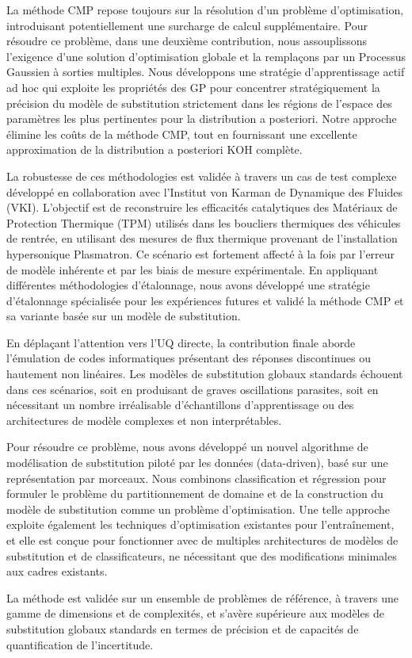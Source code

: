 \smallskip
La m\'ethode CMP repose toujours sur la r\'esolution d'un probl\`eme d'optimisation, introduisant potentiellement une surcharge de calcul suppl\'ementaire. Pour r\'esoudre ce probl\`eme,
dans une deuxi\`eme contribution, nous assouplissons l'exigence d'une solution d'optimisation globale et la rempla\c{c}ons par un Processus Gaussien \`a sorties multiples. Nous d\'eveloppons une strat\'egie d'apprentissage actif ad hoc qui exploite les propri\'et\'es des GP pour concentrer strat\'egiquement la pr\'ecision du mod\`ele de substitution strictement dans les r\'egions de l'espace des param\`etres les plus pertinentes pour la distribution a posteriori. Notre approche \'elimine les co\^uts de la m\'ethode CMP, tout en fournissant une excellente approximation de la distribution a posteriori KOH compl\`ete.

\smallskip
La robustesse de ces m\'ethodologies est valid\'ee \`a travers un cas de test complexe d\'evelopp\'e en collaboration avec l'Institut von Karman de Dynamique des Fluides (VKI). L'objectif est de reconstruire les efficacit\'es catalytiques des Mat\'eriaux de Protection Thermique (TPM) utilis\'es dans les boucliers thermiques des v\'ehicules de rentr\'ee, en utilisant des mesures de flux thermique provenant de l'installation hypersonique Plasmatron. Ce sc\'enario est fortement affect\'e \`a la fois par l'erreur de mod\`ele inh\'erente et par les biais de mesure exp\'erimentale. En appliquant diff\'erentes m\'ethodologies d'\'etalonnage, nous avons d\'evelopp\'e une strat\'egie d'\'etalonnage sp\'ecialis\'ee pour les exp\'eriences futures et valid\'e la m\'ethode CMP et sa variante bas\'ee sur un mod\`ele de substitution.

\smallskip
En d\'epla\c{c}ant l'attention vers l'UQ directe, la contribution finale aborde l'\'emulation de codes informatiques pr\'esentant des r\'eponses discontinues ou hautement non lin\'eaires. Les mod\`eles de substitution globaux standards \'echouent dans ces sc\'enarios, soit en produisant de graves oscillations parasites, soit en n\'ecessitant un nombre irr\'ealisable d'\'echantillons d'apprentissage ou des architectures de mod\`ele complexes et non interpr\'etables.

Pour r\'esoudre ce probl\`eme, nous avons d\'evelopp\'e un nouvel algorithme de mod\'elisation de substitution pilot\'e par les donn\'ees (data-driven), bas\'e sur une repr\'esentation par morceaux. Nous combinons classification et r\'egression pour formuler le probl\`eme du partitionnement de domaine et de la construction du mod\`ele de substitution comme un probl\`eme d'optimisation. Une telle approche exploite \'egalement les techniques d'optimisation existantes pour l'entra\^inement, et elle est con\c{c}ue pour fonctionner avec de multiples architectures de mod\`eles de substitution et de classificateurs, ne n\'ecessitant que des modifications minimales aux cadres existants.

La m\'ethode est valid\'ee sur un ensemble de probl\`emes de r\'ef\'erence, \`a travers une gamme de dimensions et de complexit\'es, et s'av\`ere sup\'erieure aux mod\`eles de substitution globaux standards en termes de pr\'ecision et de capacit\'es de quantification de l'incertitude.
